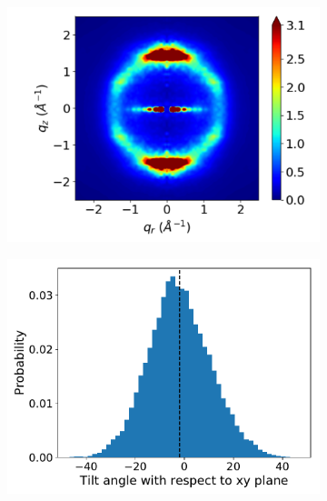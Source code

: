 \documentclass[journal=jpcbfk,manuscript=article]{achemso}
\begin{document}
  \begin{figure}[!htb]
  \begin{subfigure}{0.32\linewidth}
  	\centering
  	\includegraphics[width=\textwidth]{rzplot_layered_280K_jet.pdf}
  	\caption{}\label{fig:sandwiched280K}
  \end{subfigure}
  \begin{subfigure}{0.32\linewidth}
    \includegraphics[width=\textwidth]{tilt_dist.pdf}
    \caption{}\label{fig:tilt}
  \end{subfigure}
  \begin{subfigure}{0.32\linewidth}
	\centering

\end{subfigure}
\end{figure}
\end{document}
